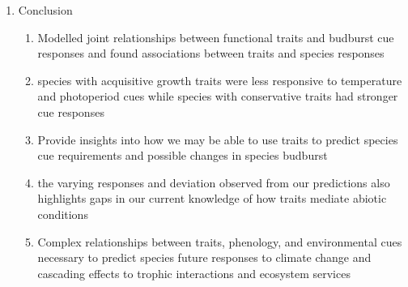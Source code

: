 \documentclass{article}
\begin{document}
\begin{enumerate}
\item Conclusion
\begin{enumerate}
\item Modelled joint relationships between functional traits and budburst cue responses and found associations between traits and species responses 
\item species with acquisitive growth traits were less responsive to temperature and photoperiod cues while species with conservative traits had stronger cue responses
\item Provide insights into how we may be able to use traits to predict species cue requirements and possible changes in species budburst
\item the varying responses and deviation observed from our predictions also highlights gaps in our current knowledge of how traits mediate abiotic conditions
\item Complex relationships between traits, phenology, and environmental cues necessary to predict species future responses to climate change and cascading effects to trophic interactions and ecosystem services
\end{enumerate}

\end{enumerate}
\end{document}
